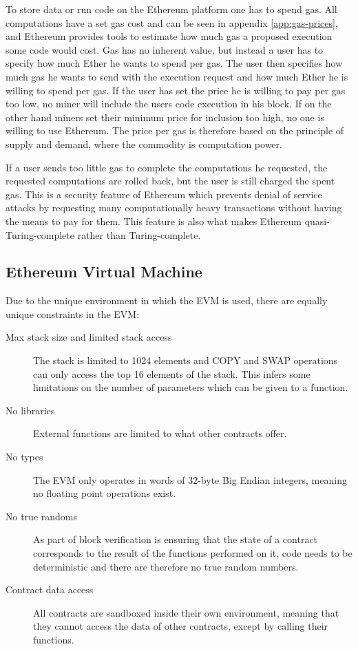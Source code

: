 \documentclass{article}
\begin{document}
		To store data or run code on the Ethereum platform one has to spend gas. 
		All computations have a set gas cost and can be seen in appendix \ref{app:gas-prices}, and Ethereum provides tools to estimate how much gas a proposed execution some code would cost.
		Gas has no inherent value, but instead a user has to specify how much Ether he wants to spend per gas. 
		The user then specifies how much gas he wants to send with the execution request and how much Ether he is willing to spend per gas. If the user has set the price he is willing to pay per gas too low, no miner will include the users code execution in his block.
		If on the other hand miners set their minimum price for inclusion too high, no one is willing to use Ethereum. 
		The price per gas is therefore based on the principle of supply and demand, where the commodity is computation power.

		If a user sends too little gas to complete the computations he requested, the requested computations are rolled back, but the user is still charged the spent gas.
		This is a security feature of Ethereum which prevents denial of service attacks by requesting many computationally heavy transactions without having the means to pay for them. 
		This feature is also what makes Ethereum quasi-Turing-complete rather than Turing-complete.

		\subsection{Ethereum Virtual Machine}	
		Due to the unique environment in which the EVM is used, there are equally unique constraints in the EVM:
		\begin{description}
			\item [Max stack size and limited stack access] The stack is limited to 1024 elements and COPY and SWAP operations can only access the top 16 elements of the stack. This infers some limitations on the number of parameters which can be given to a function.
			\item [No libraries] External functions are limited to what other contracts offer.  
			\item [No types] The EVM only operates in words of 32-byte Big Endian integers, meaning no floating point operations exist.
			\item [No true randoms] As part of block verification is ensuring that the state of a contract corresponds to the result of the functions performed on it, code needs to be deterministic and there are therefore no true random numbers.
			\item [Contract data access] All contracts are sandboxed inside their own environment, meaning that they cannot access the data of other contracts, except by calling their functions.
		\end{description}
\end{document}
